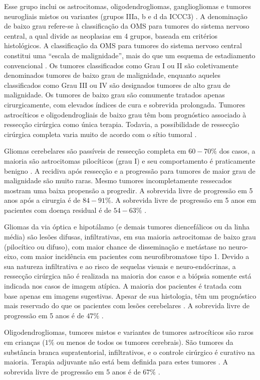 \documentclass[11pt,a4paper,oldfontcommands]{memoir}
\begin{document}
Esse grupo inclui os astrocitomas, oligodendrogliomas, gangliogliomas e tumores neurogliais mistos ou variantes (grupos IIIa, b e d da ICCC3) \cite{CNCR20910}. A denominação de baixo grau refere-se à classificação da OMS para tumores do sistema nervoso central, a qual divide as neoplasias em 4 grupos, baseada em critérios histológicos. A classificação da OMS para tumores do sistema nervoso central constitui uma “escala de malignidade”, mais do que um esquema de estadiamento convencional \cite{louis}. Os tumores classificados como Grau I ou II são coletivamente denominados tumores de baixo grau de malignidade, enquanto aqueles classificados como Grau III ou IV são designados tumores de alto grau de malignidade. Os tumores de baixo grau são comumente tratados apenas cirurgicamente, com elevados índices de cura e sobrevida prolongada. Tumores astrocíticos e oligodendrogliais de baixo grau têm bom prognóstico associado à ressecção cirúrgica como única terapia. Todavia, a possibilidade de ressecção cirúrgica completa varia muito de acordo com o sítio tumoral \cite{wisof}.

Gliomas cerebelares são passíveis de ressecção completa em \(60-70\%\) dos casos, a maioria são astrocitomas pilocíticos (grau I) e seu comportamento é praticamente benigno \cite{gan}. A recidiva após ressecção e a progressão para tumores de maior grau de malignidade são muito raras. Mesmo tumores incompletamente ressecados mostram uma baixa propensão a progredir. A sobrevida livre de progressão em 5 anos após a cirurgia é de \(84-91\%\). A sobrevida livre de progressão em 5 anos em pacientes com doença residual é de \(54-63\%\) \cite{wisof}. 

Gliomas da via óptica e hipotálamo (e demais tumores diencefálicos ou da linha média) são lesões difusas, infiltrativas, em sua maioria astrocitomas de baixo grau (pilocítico ou difuso), com maior chance de disseminação e metástase no neuro-eixo, com maior incidência em pacientes com neurofibromatose tipo 1. Devido a sua natureza infiltrativa e ao risco de sequelas visuais e neuro-endócrinas, a ressecção cirúrgica não é realizada na maioria dos casos e a biópsia somente está indicada nos casos de imagem atípica. A maioria dos pacientes é tratada com base apenas em imagens sugestivas. Apesar de sua histologia, têm um prognóstico mais reservado do que os pacientes com lesões cerebelares \cite{gan}. A sobrevida livre de progressão em 5 anos é de \(47\%\) \cite{wisof}. 

Oligodendrogliomas, tumores mistos e variantes de tumores astrocíticos são raros em crianças (\(1\%\) ou menos de todos os tumores cerebrais). São tumores da substância branca supratentorial, infiltrativos, e o controle cirúrgico é curativo na maioria. Terapia adjuvante não está bem definida para estes tumores \cite{gan}. A sobrevida livre de progressão em 5 anos é de \(67\%\) \cite{wisof}.
\end{document}
